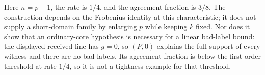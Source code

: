 Here $n=p-1$, the rate is $1/4$, and the agreement fraction is $3/8$.
The construction depends on the Frobenius identity at this characteristic;
it does not supply a short-domain family by enlarging $p$ while keeping
$k$ fixed.  Nor does it show that an ordinary-core hypothesis is necessary
for a linear bad-label bound: the displayed received line has $g=0$, so
$(P,0)$ explains the full support of every witness and there are no bad
labels.  Its agreement fraction is below the first-order threshold at
rate $1/4$, so it is not a tightness example for that threshold.
